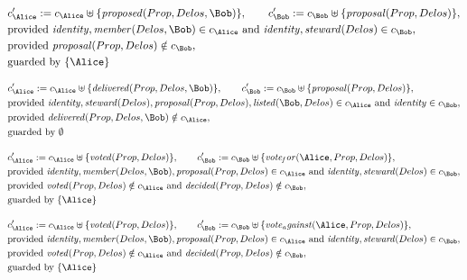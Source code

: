 \begin{align*}
&
c'_
{
\Alice
}
 := 
c_
{
\Alice
}
 \uplus 
\{
\mathit{
proposed
}
(
Prop
,
Delos
,
\Bob
)
\}
, \qquad 
c'_
{
\Bob
}
 := 
c_
{
\Bob
}
 \uplus 
\{
\mathit{
proposal
}
(
Prop
,
Delos
)
\}
,\\
&
\text{provided } 
\mathit{
identity
}
,
\mathit{
member
}
(
Delos
,
\Bob
)
 \in c_
{
\Alice
}
 \text{ and } 
\mathit{
identity
}
,
\mathit{
steward
}
(
Delos
)
 \in c_
{
\Bob
}
,\\
&
\text{provided } 
\mathit{
proposal
}
(
Prop
,
Delos
)
 \notin c_
{
\Bob
}
,\\
&
\text{guarded by } \{
\Alice
\}
\end{align*}

\begin{align*}
&
c'_
{
\Alice
}
 := 
c_
{
\Alice
}
 \uplus 
\{
\mathit{
delivered
}
(
Prop
,
Delos
,
\Bob
)
\}
, \qquad 
c'_
{
\Bob
}
 := 
c_
{
\Bob
}
 \uplus 
\{
\mathit{
proposal
}
(
Prop
,
Delos
)
\}
,\\
&
\text{provided } 
\mathit{
identity
}
,
\mathit{
steward
}
(
Delos
)
,
\mathit{
proposal
}
(
Prop
,
Delos
)
,
\mathit{
listed
}
(
\Bob
,
Delos
)
 \in c_
{
\Alice
}
 \text{ and } 
\mathit{
identity
}
 \in c_
{
\Bob
}
,\\
&
\text{provided } 
\mathit{
delivered
}
(
Prop
,
Delos
,
\Bob
)
 \notin c_
{
\Alice
}
,\\
&
\text{guarded by } \emptyset
\end{align*}

\begin{align*}
&
c'_
{
\Alice
}
 := 
c_
{
\Alice
}
 \uplus 
\{
\mathit{
voted
}
(
Prop
,
Delos
)
\}
, \qquad 
c'_
{
\Bob
}
 := 
c_
{
\Bob
}
 \uplus 
\{
\mathit{
vote_for
}
(
\Alice
,
Prop
,
Delos
)
\}
,\\
&
\text{provided } 
\mathit{
identity
}
,
\mathit{
member
}
(
Delos
,
\Bob
)
,
\mathit{
proposal
}
(
Prop
,
Delos
)
 \in c_
{
\Alice
}
 \text{ and } 
\mathit{
identity
}
,
\mathit{
steward
}
(
Delos
)
 \in c_
{
\Bob
}
,\\
&
\text{provided } 
\mathit{
voted
}
(
Prop
,
Delos
)
 \notin c_
{
\Alice
}
 \text{ and } 
\mathit{
decided
}
(
Prop
,
Delos
)
 \notin c_
{
\Bob
}
,\\
&
\text{guarded by } \{
\Alice
\}
\end{align*}

\begin{align*}
&
c'_
{
\Alice
}
 := 
c_
{
\Alice
}
 \uplus 
\{
\mathit{
voted
}
(
Prop
,
Delos
)
\}
, \qquad 
c'_
{
\Bob
}
 := 
c_
{
\Bob
}
 \uplus 
\{
\mathit{
vote_against
}
(
\Alice
,
Prop
,
Delos
)
\}
,\\
&
\text{provided } 
\mathit{
identity
}
,
\mathit{
member
}
(
Delos
,
\Bob
)
,
\mathit{
proposal
}
(
Prop
,
Delos
)
 \in c_
{
\Alice
}
 \text{ and } 
\mathit{
identity
}
,
\mathit{
steward
}
(
Delos
)
 \in c_
{
\Bob
}
,\\
&
\text{provided } 
\mathit{
voted
}
(
Prop
,
Delos
)
 \notin c_
{
\Alice
}
 \text{ and } 
\mathit{
decided
}
(
Prop
,
Delos
)
 \notin c_
{
\Bob
}
,\\
&
\text{guarded by } \{
\Alice
\}
\end{align*}
